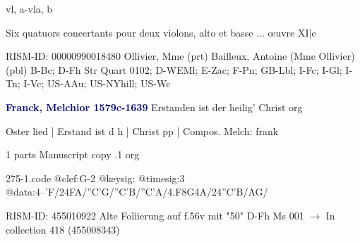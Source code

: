 \documentclass[twocolumn]{book}
\begin{document}
 vl, a-vla, b
\newline \begin{itshape}Six quatuors concertants pour deux violons, alto et basse ... œuvre XI|e\end{itshape} 
\newline RISM-ID: 00000990018480
\newline Ollivier, Mme  (prt)
\newline Bailleux, Antoine (Mme Ollivier)  (pbl)
\newline B-Bc; D-Fh  Str Quart 0102; D-WEMl; E-Zac; F-Pn; GB-Lbl; I-Fc; I-Gl; I-Tn; I-Vc; US-AAu; US-NYhill; US-Wc
\newline \par \vspace{7pt} \textcolor{darkblue}{\textbf{Franck, Melchior  1579c-1639}}
\newline Erstanden ist der heilig' Christ    
\newline org
\newline \begin{itshape}[f.56v, at left:] Oster lied | Erstand ist d h | Christ pp | Compos. Melch: frank\end{itshape} 
\newline \textcolor{darkblue}{}  1 parts  
\newline Manuscript copy
.1  org  
\begin{filecontents*}{275-1.code}
@clef:G-2
@keysig:
@timesig:3
@data:4--'F/24FA/''C'G/''C'B/''C'A/4.F8G4A/24''C'B/AG/
\end{filecontents*}
\newline
%

\newline RISM-ID: 455010922
\newline Alte Foliierung auf f.56v mit "50"
\newline D-Fh  Ms 001
\newline $\rightarrow$ In collection 418 (455008343)
\end{document}
